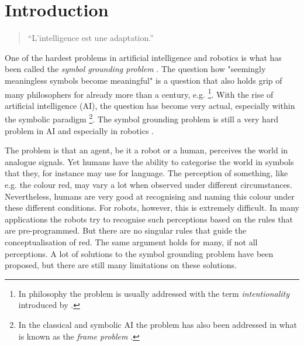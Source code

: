 


\chapter{Introduction}\label{ch:intro}


\begin{quote}
{\large ``L'intelligence est une adaptation.''\\
\cite{piaget:1966}}
\end{quote}


\noindent One of the hardest problems in artificial intelligence and robotics is what has been called the {\em symbol grounding problem} \citep{harnad:1990}. The question how "seemingly meaningless symbols become meaningful" \citep{harnad:1990} is a question that also holds grip of many philosophers for already more than a century, e.g. \citep{bretano:1874,searle:1980,dennett:1991}\footnote{In philosophy the problem is usually addressed with the term {\em intentionality} introduced by \citep{bretano:1874}.}. With the rise of artificial intelligence (AI), the question has become very actual, especially within the symbolic paradigm \citep{newell:1990}\footnote{In the classical and symbolic AI the problem has also been addressed in what is known as the {\em frame problem} \citep{pylyshyn:1987}.}. The symbol grounding problem is still a very hard problem in AI and especially in robotics \citep{pfeiferscheier:1999}.

The problem is that an agent, be it a robot or a human, perceives the world in analogue signals. Yet humans have the ability to categorise the world in symbols that they, for instance may use for language. The perception of something, like e.g. the colour red, may vary a lot when observed under different circumstances. Nevertheless, humans are very good at recognising and naming this colour under these different conditions. For robots, however, this is extremely difficult. In many applications the robots try to recognise such perceptions based on the rules that are pre-programmed. But there are no singular rules that guide the conceptualisation of red. The same argument holds for many, if not all perceptions. A lot of solutions to the symbol grounding problem have been proposed, but there are still many limitations on these solutions. 

